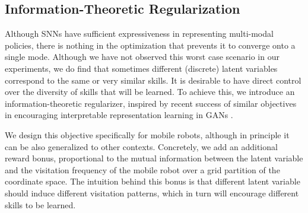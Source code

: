 \documentclass{article} %
\begin{document}



\subsection{Information-Theoretic Regularization}
\label{section:method:inforeg}

Although SNNs have sufficient expressiveness in representing multi-modal policies, there is nothing in the optimization that prevents it to converge onto a single mode. Although we have not observed this worst case scenario in our experiments, we do find that sometimes different (discrete) latent variables correspond to the same or very similar skills. It is desirable to have direct control over the diversity of skills that will be learned. To achieve this, we introduce an information-theoretic regularizer, inspired by recent success of similar objectives in encouraging interpretable representation learning in GANs \citep{chen2016infogan}.

We design this objective specifically for mobile robots, although in principle it can be also generalized to other contexts.
Concretely, we add an additional reward bonus, proportional to the mutual information between the latent variable and the visitation frequency of the mobile robot over a grid partition of the coordinate space. The intuition behind this bonus is that different latent variable should induce different visitation patterns, which in turn will encourage different skills to be learned.

\end{document}
